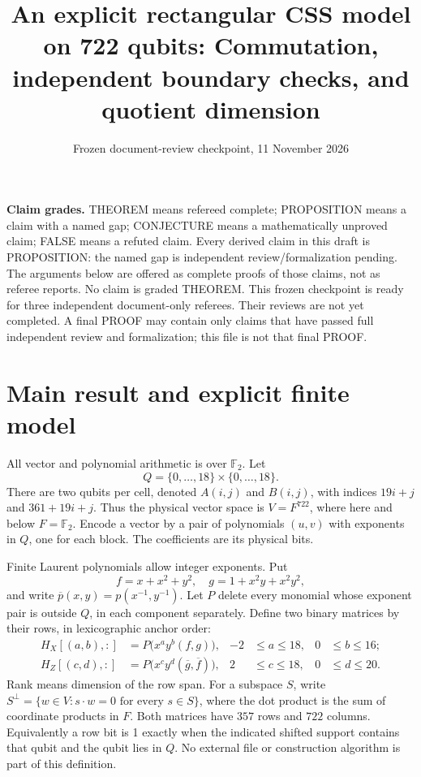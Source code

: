 \documentclass{article}
\title{An explicit rectangular CSS model on 722 qubits: Commutation, independent boundary checks, and quotient dimension}
\author{}
\date{Frozen document-review checkpoint, 11 November 2026}
\newcommand{\Ftwo}{\mathbb{F}_2}
\begin{document}
\maketitle

\textbf{Claim grades.} THEOREM means refereed complete; PROPOSITION means a claim
with a named gap; CONJECTURE means a mathematically unproved claim; FALSE means a refuted
claim. Every derived claim in this draft is PROPOSITION: the named gap is independent
review\slash formalization pending. The arguments below are offered as complete proofs of those
claims, not as referee reports. No claim is graded THEOREM. This frozen checkpoint is ready
for three independent document-only referees. Their reviews are not yet completed. A final
PROOF may contain only claims that have passed full independent review and formalization;
this file is not that final PROOF.

\section{Main result and explicit finite model}\label{sec:model}

All vector and polynomial arithmetic is over \(\Ftwo\). Let
\begin{equation}
  Q = \{0, \dots, 18\} \times \{0, \dots, 18\}.
\end{equation}
There are two qubits per cell, denoted \(A(i,j)\) and \(B(i,j)\), with indices
\(19i + j\) and \(361 + 19i + j\). Thus the physical vector space is
\(V = F^{722}\), where here and below \(F = \Ftwo\). Encode a vector by a pair
of polynomials \((u, v)\) with exponents in \(Q\), one for each block. The
coefficients are its physical bits.

Finite Laurent polynomials allow integer exponents. Put
\begin{equation}
  f = x + x^2 + y^2, \quad g = 1 + x^2 y + x^2 y^2,
\end{equation}
and write \(\overline{p}(x,y) = p(x^{-1}, y^{-1})\). Let \(P\) delete every
monomial whose exponent pair is outside \(Q\), in each component separately.
Define two binary matrices by their rows, in lexicographic anchor order:
\begin{align}
  H_X[(a,b), {:}] &= P\bigl(x^a y^b (f, g)\bigr),
  & -2 &\le a \le 18, & 0 &\le b \le 16; \\
  H_Z[(c,d), {:}] &= P\bigl(x^c y^d (\overline{g}, \overline{f})\bigr),
  & 2 &\le c \le 18, & 0 &\le d \le 20.
\end{align}
Rank means dimension of the row span. For a subspace \(S\), write
\(S^{\perp} = \{w \in V : s \cdot w = 0 \text{ for every } s \in S\}\), where
the dot product is the sum of coordinate products in \(F\). Both matrices have
\(357\) rows and \(722\) columns. Equivalently a row bit is 1 exactly when the
indicated shifted support contains that qubit and the qubit lies in \(Q\). No
external file or construction algorithm is part of this definition.
\end{document}
